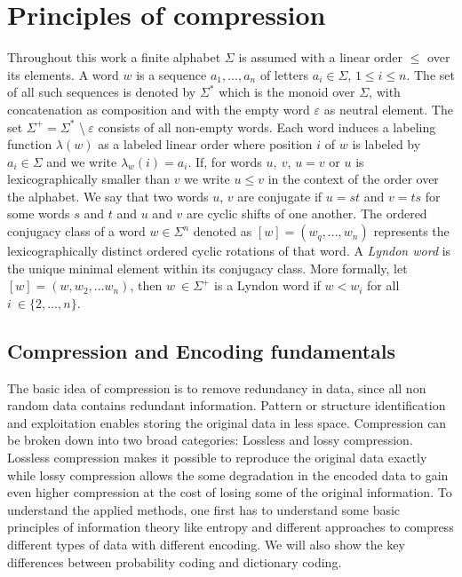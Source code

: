 
\chapter{Principles of compression}
\label{ch:Principles of compression}
\par{
Throughout this work a finite alphabet $\Sigma$ is assumed with a linear order $\leq$ over its elements. A word $w$ is a sequence $a_1,...,a_n$ of letters $a_i \in \Sigma$, $1 \leq i \leq n$. The set of all such sequences is denoted by $\Sigma^*$ which is the monoid over $\Sigma$, with concatenation as composition and with the empty word $\varepsilon$ as neutral element. The set $\Sigma^+ = \Sigma^*$ \textbackslash $\: \varepsilon$ consists of all non-empty words. Each word induces a labeling function $\lambda(w)$ as a labeled linear order where position $i$ of $w$ is labeled by $a_i \in \Sigma$ and we write $\lambda_w (i) = a_i$. If, for words $u, \: v$, $u = v$ or $u$ is lexicographically smaller than $v$ we write $u \leq v$ in the context of the order over the alphabet. We say that two words $u$, $v$ are conjugate if $u = st$ and $v = ts$ for some words $s$ and $t$ and $u$ and $v$ are cyclic shifts of one another. The ordered conjugacy class of a word $w \in \Sigma^n$ denoted as $[w] = (w_q,...,w_n)$ represents the lexicographically distinct ordered cyclic rotations of that word. A \emph{Lyndon word} is the unique minimal element within its conjugacy class. More formally, let $[w] = (w,w_2,...w_n)$, then $w \: \in \Sigma^+$ is a Lyndon word if $w<w_i$ for all $i \: \in \{2,...,n\}$.
}

\section{Compression and Encoding fundamentals}
\label{ch:Principles of compression:sec:Compression}
\par{
	The basic idea of compression is to remove redundancy in data, since all non random data contains redundant information. Pattern or structure identification and exploitation enables storing the original data in less space. Compression can be broken down into two broad categories: Lossless and lossy compression. Lossless compression makes it possible to reproduce the original data exactly while lossy compression allows the some degradation in the encoded data to gain even higher compression at the cost of losing some of the original information. To understand the applied methods, one first has to understand some basic principles of information theory like entropy and different approaches to compress different types of data with different encoding. We will also show the key differences between probability coding and dictionary coding.}

